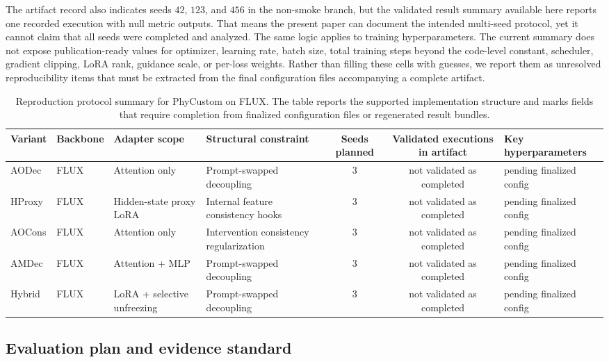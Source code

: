 \documentclass{article}
\begin{document}
The artifact record also indicates seeds \(42\), \(123\), and \(456\) in the non-smoke branch, but the validated result summary available here reports one recorded execution with null metric outputs. That means the present paper can document the intended multi-seed protocol, yet it cannot claim that all seeds were completed and analyzed. The same logic applies to training hyperparameters. The current summary does not expose publication-ready values for optimizer, learning rate, batch size, total training steps beyond the code-level constant, scheduler, gradient clipping, LoRA rank, guidance scale, or per-loss weights. Rather than filling these cells with guesses, we report them as unresolved reproducibility items that must be extracted from the final configuration files accompanying a complete artifact.

\begin{table}[htbp]
    \centering
    \caption{Reproduction protocol summary for PhyCustom on FLUX. The table reports the supported implementation structure and marks fields that require completion from finalized configuration files or regenerated result bundles.}
    \label{tab:protocol_summary}
    \begin{tabular}{llllccp{4.2cm}}
        \toprule
        Variant & Backbone & Adapter scope & Structural constraint & Seeds planned & Validated executions in artifact & Key hyperparameters \\
        \midrule
        AODec & FLUX & Attention only & Prompt-swapped decoupling & 3 & not validated as completed & pending finalized config \\
        HProxy & FLUX & Hidden-state proxy LoRA & Internal feature consistency hooks & 3 & not validated as completed & pending finalized config \\
        AOCons & FLUX & Attention only & Intervention consistency regularization & 3 & not validated as completed & pending finalized config \\
        AMDec & FLUX & Attention + MLP & Prompt-swapped decoupling & 3 & not validated as completed & pending finalized config \\
        Hybrid & FLUX & LoRA + selective unfreezing & Prompt-swapped decoupling & 3 & not validated as completed & pending finalized config \\
        \bottomrule
    \end{tabular}
\end{table}

\subsection{Evaluation plan and evidence standard}
\end{document}
